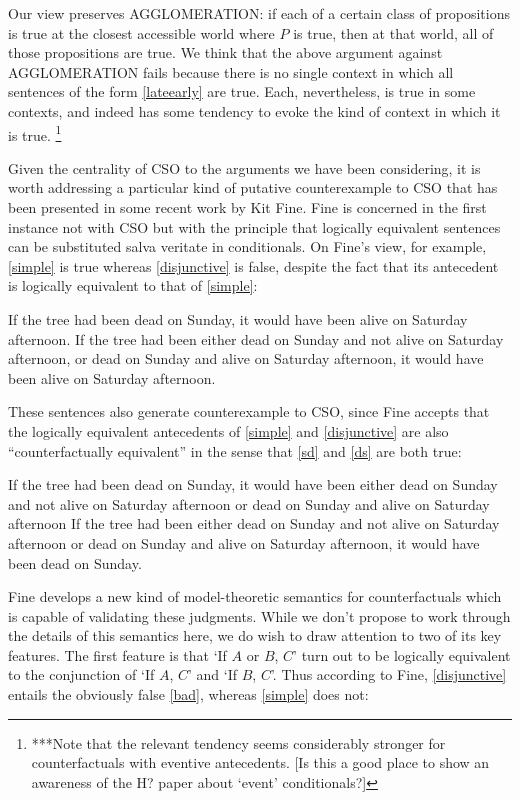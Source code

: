 \documentclass[If.tex]{subfiles}
\begin{document}
Our view preserves AGGLOMERATION: if each of a certain class of propositions is true at the closest accessible world where $P$ is true, then at that world, all of those propositions are true. We think that the above argument against AGGLOMERATION fails because there is no single context in which all sentences of the form \ref{lateearly} are true. Each, nevertheless, is true in some contexts, and indeed has some tendency to evoke the kind of context in which it is true.%
\footnote{***Note that the relevant tendency seems considerably stronger for counterfactuals with eventive antecedents. [Is this a good place to show an awareness of the H? paper about ‘event’ conditionals?]}

Given the centrality of CSO to the arguments we have been considering, it is worth addressing a particular kind of putative counterexample to CSO that has been presented in some recent work by Kit Fine. Fine is concerned in the first instance not with CSO but with the principle that logically equivalent sentences can be substituted salva veritate in conditionals. On Fine's view, for example, \ref{simple} is true whereas \ref{disjunctive} is false, despite the fact that its antecedent is logically equivalent to that of \ref{simple}:
\begin{prop}
	\nitem \label{simple}
		If the tree had been dead on Sunday, it would have been alive on Saturday afternoon.
	\nitem \label{disjunctive}
		If the tree had been either dead on Sunday and not alive on Saturday afternoon, or dead on Sunday and alive on Saturday afternoon, it would have been alive on Saturday afternoon.
\end{prop}
These sentences also generate counterexample to CSO, since Fine accepts that the logically equivalent antecedents of \ref{simple} and \ref{disjunctive} are also “counterfactually equivalent” in the sense that \ref{sd} and \ref{ds} are both true:
\begin{prop}
	\nitem \label{sd}
		If the tree had been dead on Sunday, it would have been either dead on Sunday and not alive on Saturday afternoon or dead on Sunday and alive on Saturday afternoon
	\nitem \label{ds}
		If the tree had been either dead on Sunday and not alive on Saturday afternoon or dead on Sunday and alive on Saturday afternoon, it would have been dead on Sunday.
\end{prop}
Fine develops a new kind of model-theoretic semantics for counterfactuals which is capable of validating these judgments. While we don't propose to work through the details of this semantics here, we do wish to draw attention to two of its key features. The first feature is that ‘If $A$ or $B$, $C$’ turn out to be logically equivalent to the conjunction of ‘If $A$, $C$’ and ‘If $B$, $C$’. Thus according to Fine, \ref{disjunctive} entails the obviously false \ref{bad}, whereas \ref{simple} does not:
\end{document}
